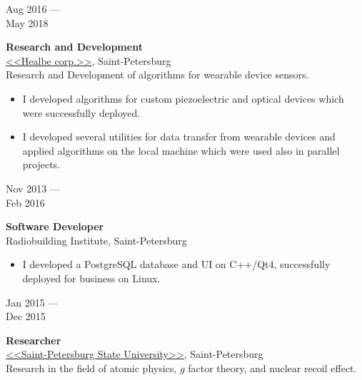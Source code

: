 \documentclass[10pt,a4paper]{article}
\newcommand{\lmpratio}{0.15}
\newcommand{\rmpratio}{0.74}
\newcommand{\vSpace}{0.5cm}
\newcommand{\horizontalSpace}{0.05\textwidth}
\newcommand{\sectionMain}[1]{\textbf{#1}}
\begin{document}
	\begin{minipage}[t]{\lmpratio\textwidth}
		Aug 2016 --- \\May 2018
	\end{minipage}
	\hspace{\horizontalSpace}
	\begin{minipage}[t]{\rmpratio\textwidth}
		\sectionMain{Research and Development}\\
		\href{https://healbe.com/}{<<Healbe corp.>>}, Saint-Petersburg\\[0.1cm]	
  
Research and Development of algorithms for wearable device sensors.
		\begin{itemize}
                \item 
I developed algorithms for custom piezoelectric and optical devices which were successfully deployed.
                \item 
I developed several utilities for data transfer from wearable devices and applied algorithms on the local machine which were used also in parallel projects.
            \end{itemize}
		 
		
	\end{minipage}	
	\vspace{\vSpace}


        \begin{minipage}[t]{\lmpratio\textwidth}
		Nov 2013 --- \\Feb 2016
	\end{minipage}
	\hspace{\horizontalSpace}
	\begin{minipage}[t]{\rmpratio\textwidth}
		\sectionMain{Software Developer}\\
		Radiobuilding Institute, Saint-Petersburg\\[0.1cm]
            \begin{itemize}
                \item
I developed a PostgreSQL database and UI on C++/Qt4, successfully deployed for business on Linux.
            \end{itemize}

	\end{minipage}

		\vspace{\vSpace}
	
	\begin{minipage}[t]{\lmpratio\textwidth}
		Jan 2015 --- \\Dec 2015
	\end{minipage}
	\hspace{\horizontalSpace}
	\begin{minipage}[t]{\rmpratio\textwidth}
		\sectionMain{Researcher}\\
		\href{http://english.spbu.ru/}{<<Saint-Petersburg State University>>}, Saint-Petersburg\\[0.5cm]		
		Research in the field of atomic physics, $g$ factor theory, and nuclear recoil effect. \\

	\end{minipage}
	\vspace{\vSpace}
\end{document}
